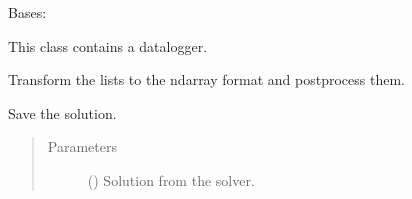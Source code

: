 \documentclass[letterpaper,10pt,english]{sphinxmanual}
\begin{document}
\begin{fulllineitems}
\label{\detokenize{model:model.im_drive.Datalogger}}
\pysigstartsignatures
{}
\pysigstopsignatures
\sphinxAtStartPar
Bases: 

\sphinxAtStartPar
This class contains a datalogger.

\begin{fulllineitems}
\label{\detokenize{model:model.im_drive.Datalogger.post_process}}
\pysigstartsignatures
{}
\pysigstopsignatures
\sphinxAtStartPar
Transform the lists to the ndarray format and post\sphinxhyphen{}process them.

\end{fulllineitems}


\begin{fulllineitems}
\label{\detokenize{model:model.im_drive.Datalogger.save}}
\pysigstartsignatures
{}
\pysigstopsignatures
\sphinxAtStartPar
Save the solution.
\begin{quote}\begin{description}
\item[{Parameters}] \leavevmode
\sphinxAtStartPar
{} () \textendash{} Solution from the solver.

\end{description}\end{quote}

\end{fulllineitems}


\end{fulllineitems}

\end{document}
